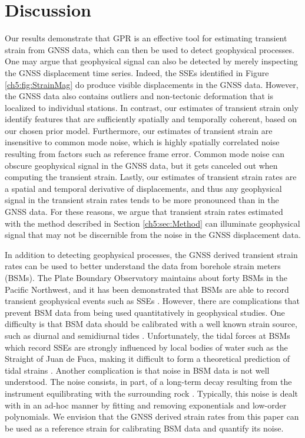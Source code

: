 \section{Discussion}\label{ch5:sec:Discussion}
Our results demonstrate that GPR is an effective tool for estimating transient strain from GNSS data, which can then be used to detect geophysical processes. One may argue that geophysical signal can also be detected by merely inspecting the GNSS displacement time series. Indeed, the SSEs identified in Figure \ref{ch5:fig:StrainMag} do produce visible displacements in the GNSS data. However, the GNSS data also contains outliers and non-tectonic deformation that is localized to individual stations. In contrast, our estimates of transient strain only identify features that are sufficiently spatially and temporally coherent, based on our chosen prior model. Furthermore, our estimates of transient strain are insensitive to common mode noise, which is highly spatially correlated noise resulting from factors such as reference frame error. Common mode noise can obscure geophysical signal in the GNSS data, but it gets canceled out when computing the transient strain. Lastly, our estimates of transient strain rates are a spatial and temporal derivative of displacements, and thus any geophysical signal in the transient strain rates tends to be more pronounced than in the GNSS data. For these reasons, we argue that transient strain rates estimated with the method described in Section \ref{ch5:sec:Method} can illuminate geophysical signal that may not be discernible from the noise in the GNSS displacement data. 

In addition to detecting geophysical processes, the GNSS derived transient strain rates can be used to better understand the data from borehole strain meters (BSMs). The Plate Boundary Observatory maintains about forty BSMs in the Pacific Northwest, and it has been demonstrated that BSMs are able to record transient geophysical events such as SSEs \citep[e.g.,][]{Dragert2011}. However, there are complications that prevent BSM data from being used quantitatively in geophysical studies. One difficulty is that BSM data should be calibrated with a well known strain source, such as diurnal and semidiurnal tides \citep{Hart1996,Roeloffs2010,Hodgkinson2013}. Unfortunately, the tidal forces at BSMs which record SSEs are strongly influenced by local bodies of water such as the Straight of Juan de Fuca, making it difficult to form a theoretical prediction of tidal strains \citep{Roeloffs2010}. Another complication is that noise in BSM data is not well understood. The noise consists, in part, of a long-term decay resulting from the instrument equilibrating with the surrounding rock \citep{Gladwin1987}. Typically, this noise is dealt with in an ad-hoc manner by fitting and removing exponentials and low-order polynomials. We envision that the GNSS derived strain rates from this paper can be used as a reference strain for calibrating BSM data and quantify its noise.    

